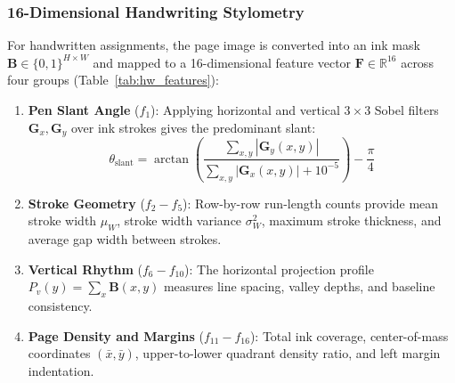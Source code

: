 \documentclass[conference]{IEEEtran}
\begin{document}
\subsubsection{16-Dimensional Handwriting Stylometry}
For handwritten assignments, the page image is converted into an ink mask $\mathbf{B} \in \{0, 1\}^{H \times W}$ and mapped to a 16-dimensional feature vector $\mathbf{F} \in \mathbb{R}^{16}$ across four groups (Table~\ref{tab:hw_features}):
\begin{enumerate}
    \item \textbf{Pen Slant Angle} ($f_1$): Applying horizontal and vertical $3 \times 3$ Sobel filters $\mathbf{G}_x, \mathbf{G}_y$ over ink strokes gives the predominant slant:
    \begin{equation}
    \theta_{\text{slant}} = \arctan\left( \frac{\sum_{x,y} |\mathbf{G}_y(x,y)|}{\sum_{x,y} |\mathbf{G}_x(x,y)| + 10^{-5}} \right) - \frac{\pi}{4}
    \end{equation}
    \item \textbf{Stroke Geometry} ($f_2 - f_5$): Row-by-row run-length counts provide mean stroke width $\mu_W$, stroke width variance $\sigma_W^2$, maximum stroke thickness, and average gap width between strokes.
    \item \textbf{Vertical Rhythm} ($f_6 - f_{10}$): The horizontal projection profile $P_v(y) = \sum_{x} \mathbf{B}(x,y)$ measures line spacing, valley depths, and baseline consistency.
    \item \textbf{Page Density and Margins} ($f_{11} - f_{16}$): Total ink coverage, center-of-mass coordinates $(\bar{x}, \bar{y})$, upper-to-lower quadrant density ratio, and left margin indentation.
\end{enumerate}

\begin{table}[htbp]
\caption{The 16-Dimensional Handwriting Feature Vector}
\label{tab:hw_features}
\begin{center}
\end{center}
\end{table}
\end{document}
